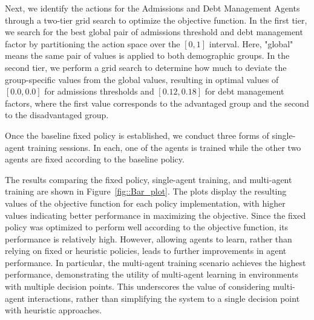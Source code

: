 Next, we identify the actions for the Admissions and Debt Management Agents through a two-tier grid search to optimize the objective function. In the first tier, we search for the best global pair of admissions threshold and debt management factor by partitioning the action space over the $[0,1]$ interval. Here, "global" means the same pair of values is applied to both demographic groups. In the second tier, we perform a grid search to determine how much to deviate the group-specific values from the global values, resulting in optimal values of $[0.0, 0.0]$ for admissions thresholds and $[0.12, 0.18]$ for debt management factors, where the first value corresponds to the advantaged group and the second to the disadvantaged group.

Once the baseline fixed policy is established, we conduct three forms of single-agent training sessions. In each, one of the agents is trained while the other two agents are fixed according to the baseline policy.

The results comparing the fixed policy, single-agent training, and multi-agent training are shown in Figure~\ref{fig::Bar_plot}. The plots display the resulting values of the objective function for each policy implementation, with higher values indicating better performance in maximizing the objective. Since the fixed policy was optimized to perform well according to the objective function, its performance is relatively high. However, allowing agents to learn, rather than relying on fixed or heuristic policies, leads to further improvements in agent performance. In particular, the multi-agent training scenario achieves the highest performance, demonstrating the utility of multi-agent learning in environments with multiple decision points. This underscores the value of considering multi-agent interactions, rather than simplifying the system to a single decision point with heuristic approaches.
